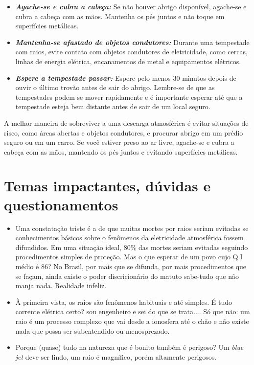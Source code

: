 \documentclass[a4paper, 12pt, onecolumn,singlespacing]{article}
\begin{document}
\begin{itemize}
\begin{itemize}
			\item \textbf{\textit{Agache-se e cubra a cabeça:}} Se não houver abrigo disponível, agache-se e cubra a cabeça com as mãos. Mantenha os pés juntos e não toque em superfícies metálicas.
			
			\item \textbf{\textit{Mantenha-se afastado de objetos condutores:}} Durante uma tempestade com raios, evite contato com objetos condutores de eletricidade, como cercas, linhas de energia elétrica, encanamentos de metal e equipamentos elétricos.
			
			\item \textbf{\textit{Espere a tempestade passar:}} Espere pelo menos 30 minutos depois de ouvir o último trovão antes de sair do abrigo. Lembre-se de que as tempestades podem se mover rapidamente e é importante esperar até que a tempestade esteja bem distante antes de sair de um local seguro.
		\end{itemize}		
		
		A melhor maneira de sobreviver a uma descarga atmosférica é evitar situações de risco, como áreas abertas e objetos condutores, e procurar abrigo em um prédio seguro ou em um carro. Se você estiver preso ao ar livre, agache-se e cubra a cabeça com as mãos, mantendo os pés juntos e evitando superfícies metálicas.
		
	\end{itemize}

	\section{Temas impactantes, dúvidas e questionamentos}
		\begin{itemize}
			\item Uma constatação triste é a de que muitas mortes por raios seriam evitadas se conhecimentos básicos sobre o fenômenos da eletricidade atmosférica fossem difundidos. Em uma situação ideal, 80\% das mortes seriam evitadas seguindo procedimentos simples de proteção. Mas o que esperar de um povo cujo Q.I médio é 86? No Brasil, por mais que se difunda, por mais procedimentos que se façam, ainda existe o poder discricionário do matuto sabe-tudo que não manja nada. Realidade infeliz.
			\item À primeira vista, os raios são fenômenos habituais e até simples. É tudo corrente elétrica certo? sou engenheiro e sei do que se trata.... Só que não: um raio é um processo complexo que vai desde a ionosfera até o chão e não existe nada que possa ser subentendido ou menosprezado.
			\item Porque (quase) tudo na natureza que é bonito também é perigoso? Um \textit{blue jet} deve ser lindo, um raio é magnífico, porém altamente perigosos.
		\end{itemize}
\end{document}
